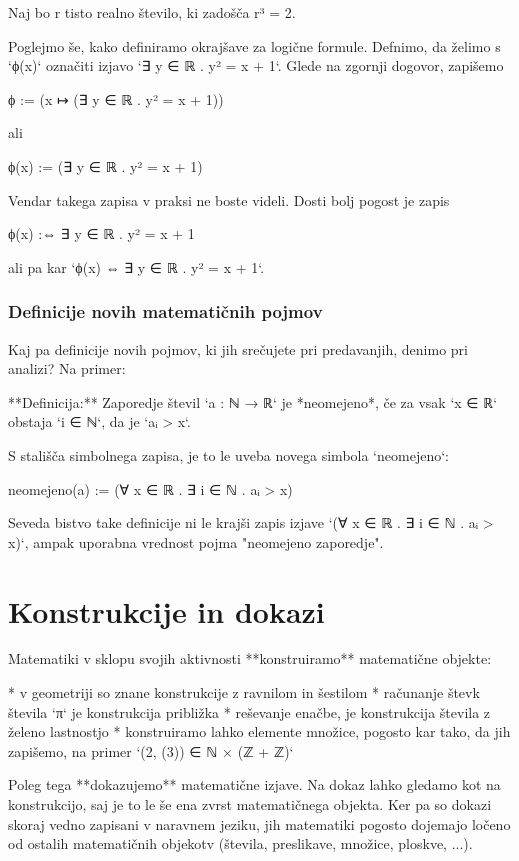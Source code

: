     Naj bo r tisto realno število, ki zadošča r³ = 2.

Poglejmo še, kako definiramo okrajšave za logične formule. Defnimo, da želimo s `ϕ(x)` označiti izjavo `∃ y ∈ ℝ . y² =
x + 1`. Glede na zgornji dogovor, zapišemo

    ϕ := (x ↦ (∃ y ∈ ℝ . y² = x + 1))

ali

    ϕ(x) := (∃ y ∈ ℝ . y² = x + 1)

Vendar takega zapisa v praksi ne boste videli. Dosti bolj pogost je zapis

    ϕ(x) :⇔ ∃ y ∈ ℝ . y² = x + 1

ali pa kar `ϕ(x) ⇔ ∃ y ∈ ℝ . y² = x + 1`.


\subsection{Definicije novih matematičnih pojmov}

Kaj pa definicije novih pojmov, ki jih srečujete pri predavanjih, denimo pri analizi? Na primer:

**Definicija:** Zaporedje števil `a : ℕ → ℝ` je *neomejeno*, če za vsak `x ∈ ℝ` obstaja `i ∈ ℕ`, da je `aᵢ > x`.

S stališča simbolnega zapisa, je to le uveba novega simbola `neomejeno`:

    neomejeno(a) := (∀ x ∈ ℝ . ∃ i ∈ ℕ . aᵢ > x)

Seveda bistvo take definicije ni le krajši zapis izjave `(∀ x ∈ ℝ . ∃ i ∈ ℕ . aᵢ > x)`, ampak uporabna vrednost pojma
"neomejeno zaporedje".


\chapter{Konstrukcije in dokazi}

Matematiki v sklopu svojih aktivnosti **konstruiramo** matematične objekte:

* v geometriji so znane konstrukcije z ravnilom in šestilom
* računanje števk števila `π` je konstrukcija približka
* reševanje enačbe, je konstrukcija števila z želeno lastnostjo
* konstruiramo lahko elemente množice, pogosto kar tako, da jih zapišemo, na primer `(2, \inl(3)) ∈ ℕ × (ℤ + ℤ)`

Poleg tega **dokazujemo** matematične izjave. Na dokaz lahko gledamo kot na konstrukcijo, saj je to le še ena zvrst
matematičnega objekta. Ker pa so dokazi skoraj vedno zapisani v naravnem jeziku, jih matematiki pogosto dojemajo ločeno
od ostalih matematičnih objekotv (števila, preslikave, množice, ploskve, ...).

